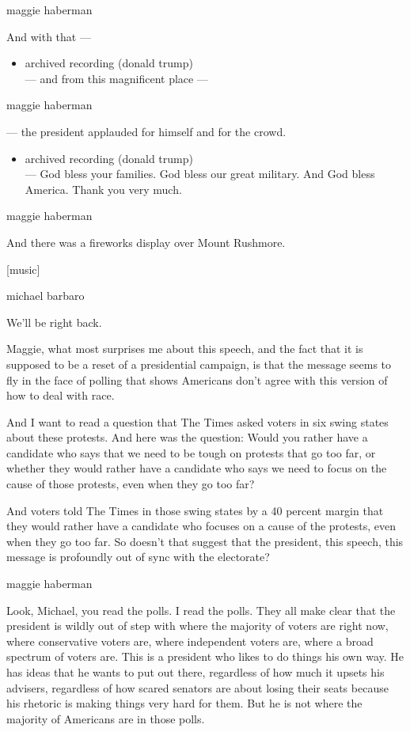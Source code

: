 maggie haberman

And with that ---

\begin{itemize}
\tightlist
\item
  archived recording (donald trump)\\
  --- and from this magnificent place ---
\end{itemize}

maggie haberman

--- the president applauded for himself and for the crowd.

\begin{itemize}
\tightlist
\item
  archived recording (donald trump)\\
  --- God bless your families. God bless our great military. And God
  bless America. Thank you very much.
\end{itemize}

maggie haberman

And there was a fireworks display over Mount Rushmore.

{[}music{]}

michael barbaro

We'll be right back.

Maggie, what most surprises me about this speech, and the fact that it
is supposed to be a reset of a presidential campaign, is that the
message seems to fly in the face of polling that shows Americans don't
agree with this version of how to deal with race.

And I want to read a question that The Times asked voters in six swing
states about these protests. And here was the question: Would you rather
have a candidate who says that we need to be tough on protests that go
too far, or whether they would rather have a candidate who says we need
to focus on the cause of those protests, even when they go too far?

And voters told The Times in those swing states by a 40 percent margin
that they would rather have a candidate who focuses on a cause of the
protests, even when they go too far. So doesn't that suggest that the
president, this speech, this message is profoundly out of sync with the
electorate?

maggie haberman

Look, Michael, you read the polls. I read the polls. They all make clear
that the president is wildly out of step with where the majority of
voters are right now, where conservative voters are, where independent
voters are, where a broad spectrum of voters are. This is a president
who likes to do things his own way. He has ideas that he wants to put
out there, regardless of how much it upsets his advisers, regardless of
how scared senators are about losing their seats because his rhetoric is
making things very hard for them. But he is not where the majority of
Americans are in those polls.


